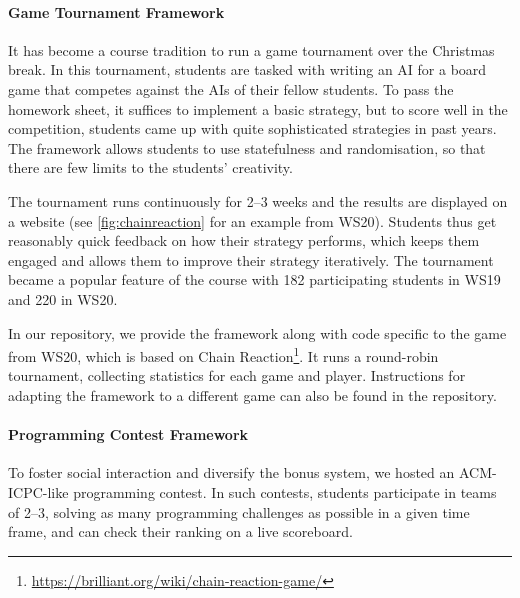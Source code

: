 \paragraph{Game Tournament Framework}
It has become a course tradition to run a game tournament over the Christmas break.
In this tournament, students are tasked with writing an AI for a board game that competes against the AIs of their fellow students.
To pass the homework sheet, it suffices to implement a basic strategy, but to score well in the competition, students came up with quite sophisticated strategies in past years.
The framework allows students to use statefulness and randomisation, so that there are few limits to the students' creativity.

The tournament runs continuously for 2--3 weeks and the results are displayed on a website (see \cref{fig:chainreaction} for an example from WS20).
Students thus get reasonably quick feedback on how their strategy performs,
which keeps them engaged and allows them to improve their strategy iteratively.
The tournament became a popular feature of the course with 182 participating students in WS19 and 220 in WS20.

In our repository, we provide the framework along with code specific to the game from WS20, which is based on Chain Reaction\footnote{\url{ https://brilliant.org/wiki/chain-reaction-game/}}.
It runs a round-robin tournament,
collecting statistics for each game and player.
Instructions for adapting the framework to a different game can also be found in the repository.

\paragraph{Programming Contest Framework}\label{sec:contest}
To foster social interaction and diversify the bonus system,
we hosted an ACM-ICPC-like programming contest.
In such contests, students
participate in teams of 2--3,
solving as many programming challenges as possible in a given time frame,
and can check their ranking on a live scoreboard.


